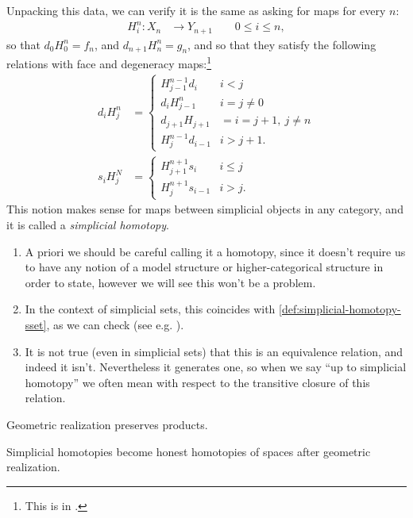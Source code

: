 \documentclass[11pt,openany]{book}
\begin{document}
\begin{remark}
Unpacking this data, we can verify it is the same as asking for maps for every $n$:
\begin{align*}
    H_i^n \colon X_n &\to Y_{n+1} \quad\quad 0\le i\le n,
\end{align*}
so that $d_0 H_0^n = f_n$, and $d_{n+1}H_n^n = g_n$, and so that they satisfy the following relations with face and degeneracy maps:\footnote{%
This is in \cite[8.3.11]{Weibel}.
}
\begin{align*}
    d_i H_j^n &= \begin{cases}
    H_{j-1}^{n-1}d_i & i<j \\
    d_i H_{j-1}^n & i=j\ne 0 \\
    d_{j+1} H_{j+1} &= i = j+1,\ j\ne n \\
    H_{j}^{n-1} d_{i-1} & i > j+1.
    \end{cases} \\
    s_i H_j^N &= \begin{cases}
    H_{j+1}^{n+1} s_i & i\le j \\
    H_{j}^{n+1} s_{i-1} & i>j.
    \end{cases}
\end{align*}
This notion makes sense for maps between simplicial objects in any category, and it is called a \textit{simplicial homotopy}.
\begin{enumerate}
    \item A priori we should be careful calling it a homotopy, since it doesn't require us to have any notion of a model structure or higher-categorical structure in order to state, however we will see this won't be a problem.
    \item In the context of simplicial sets, this coincides with \autoref{def:simplicial-homotopy-sset}, as we can check (see e.g. \cite[8.3.12]{Weibel}).
    \item It is not true (even in simplicial sets) that this is an equivalence relation, and indeed it isn't. Nevertheless it generates one, so when we say ``up to simplicial homotopy'' we often mean with respect to the transitive closure of this relation.
\end{enumerate}
\end{remark}


\begin{theorem} Geometric realization preserves products.
\end{theorem}

\begin{corollary} Simplicial homotopies become honest homotopies of spaces after geometric realization.
\end{corollary}
\end{document}
